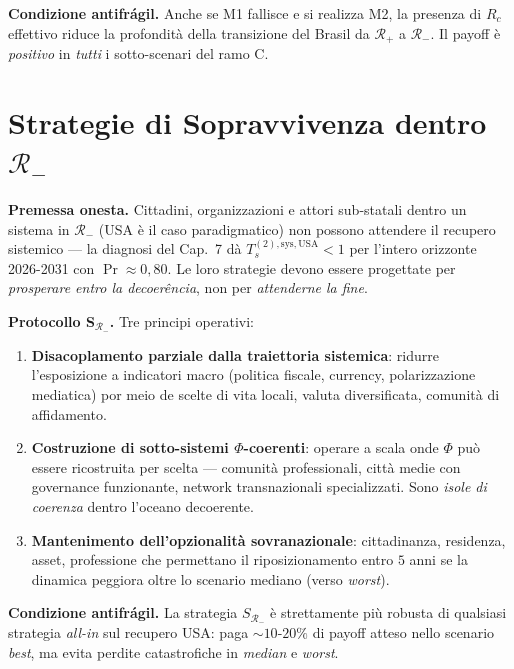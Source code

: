 \Proved{} \textbf{Condizione antifrágil.} Anche se M1 fallisce e si
realizza M2, la presenza di \(R_c\) effettivo riduce la profondità della
transizione del Brasil da \(\mathcal{R}_+\) a \(\mathcal{R}_-\). Il
payoff è \emph{positivo} in \emph{tutti} i sotto-scenari del ramo C.



\section{\texorpdfstring{Strategie di Sopravvivenza dentro
\(\mathcal{R}_-\)}{Strategie di Sopravvivenza dentro \textbackslash mathcal\{R\}\_-}}\label{strategie-di-sopravvivenza-dentro-mathcalr_-}

\Hypoth{} \textbf{Premessa onesta.} Cittadini, organizzazioni e attori
sub-statali dentro un sistema in \(\mathcal{R}_-\) (USA è il caso
paradigmatico) non possono attendere il recupero sistemico --- la
diagnosi del Cap.~7 dà \(T_s^{(2),\text{sys},\text{USA}} < 1\) per
l'intero orizzonte 2026-2031 con \(\Pr \approx 0{,}80\). Le loro
strategie devono essere progettate per \emph{prosperare entro la
decoerência}, non per \emph{attenderne la fine}.

\Hypoth{} \textbf{Protocollo S\(_{\mathcal{R}_-}\).} Tre principi
operativi:

\begin{enumerate}
\def\labelenumi{\arabic{enumi}.}
\tightlist
\item
  \textbf{Disacoplamento parziale dalla traiettoria sistemica}:
  ridurre l'esposizione a indicatori macro (politica fiscale, currency,
  polarizzazione mediatica) por meio de scelte di vita locali, valuta
  diversificata, comunità di affidamento.
\item
  \textbf{Costruzione di sotto-sistemi \(\Phi\)-coerenti}: operare a
  scala onde \(\Phi\) può essere ricostruita per scelta --- comunità
  professionali, città medie con governance funzionante, network
  transnazionali specializzati. Sono \emph{isole di coerenza} dentro
  l'oceano decoerente.
\item
  \textbf{Mantenimento dell'opzionalità sovranazionale}: cittadinanza,
  residenza, asset, professione che permettano il riposizionamento entro
  \(5\) anni se la dinamica peggiora oltre lo scenario mediano (verso
  \emph{worst}).
\end{enumerate}

\Proved{} \textbf{Condizione antifrágil.} La strategia
\(S_{\mathcal{R}_-}\) è strettamente più robusta di qualsiasi strategia
\emph{all-in} sul recupero USA: paga \(\sim 10\)-\(20\%\) di payoff
atteso nello scenario \emph{best}, ma evita perdite catastrofiche in
\emph{median} e \emph{worst}.




